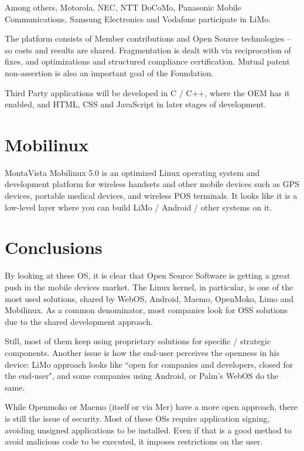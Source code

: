 \documentclass[12pt]{article}
\begin{document}
Among others, Motorola, NEC, NTT DoCoMo, Panasonic Mobile Communications, Samsung Electronics and Vodafone participate in LiMo. 
              
The platform consists of Member contributions and Open Source technologies -- so costs and results are shared. Fragmentation is dealt with via reciprocation of fixes, and optimizations and structured compliance certification\cite{limo:faq}. Mutual patent non-assertion is also an important goal of the Foundation.

Third Party applications will be developed in C / C++, where the OEM has it enabled, and HTML, CSS and JavaScript in later stages of development.

\section{Mobilinux}

MontaVista Mobilinux 5.0 is an optimized Linux operating system and development platform for wireless handsets and other mobile devices such as GPS devices, portable medical devices, and wireless POS terminals. It looks like it is a low-level layer where you can build LiMo / Android / other systems on it\cite{wiki:mobilinux,mobilinux:about}.

\section{Conclusions}

By looking at these OS, it is clear that Open Source Software is getting a great push in the mobile devices market. The Linux kernel, in particular, is one of the most used solutions, shared by WebOS, Android, Maemo, OpenMoko, Limo and Mobilinux. As a common denominator, most companies look for OSS solutions due to the shared development approach. 

Still, most of them keep using proprietary solutions for specific / strategic components. Another issue is how the end-user perceives the openness in his device: LiMo approach looks like ``open for companies and developers, closed for the end-user", and some companies using Android, or Palm's WebOS do the same.

While Openmoko or Maemo (itself or via Mer) have a more open approach, there is still the issue of security. Most of these OSs require application signing, avoiding unsigned applications to be installed. Even if that is a good method to avoid malicious code to be executed, it imposes restrictions on the user.


 
\end{document}
